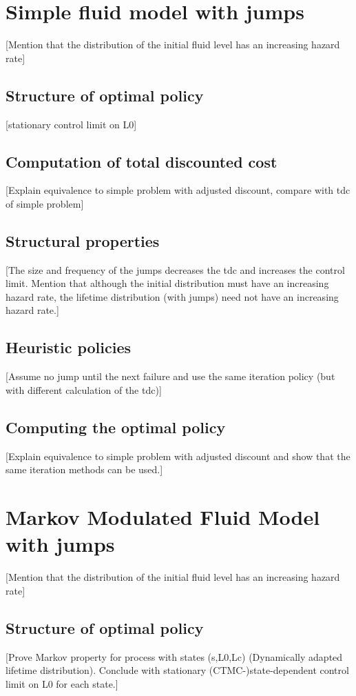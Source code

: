 \chapter{Simple fluid model with jumps}
[Mention that the distribution of the initial fluid level has an increasing hazard rate]
\section{Structure of optimal policy}
[stationary control limit on L0]
\section{Computation of total discounted cost}
[Explain equivalence to simple problem with adjusted discount, compare with tdc of simple problem]
\section{Structural properties}
[The size and frequency of the jumps decreases the tdc and increases the control limit. Mention that although the initial distribution must have an increasing hazard rate, the lifetime distribution (with jumps) need not have an increasing hazard rate.]
\section{Heuristic policies}
[Assume no jump until the next failure and use the same iteration policy (but with different calculation of the tdc)]
\section{Computing the optimal policy}
[Explain equivalence to simple problem with adjusted discount and show that the same iteration methods can be used.]

\chapter{Markov Modulated Fluid Model with jumps}
[Mention that the distribution of the initial fluid level has an increasing hazard rate]
\section{Structure of optimal policy}
[Prove Markov property for process with states (s,L0,Lc) (Dynamically adapted lifetime distribution). Conclude with stationary (CTMC-)state-dependent control limit on L0 for each state.]
